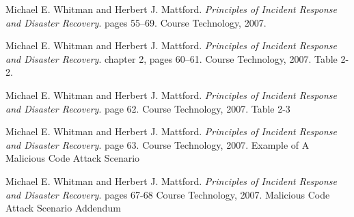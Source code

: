\documentclass[english]{gucreport}
\begin{document}
	\makefrontpages
	\tableofcontents
	\showindex		%
	
	
	
	
	
	
	
	\begin{thebibliography}{99}
			Michael E. Whitman and Herbert J. Mattford.
			\emph{Principles of Incident Response and Disaster Recovery}.
			pages 55–69.
			Course Technology, 2007.
			
			Michael E. Whitman and Herbert J. Mattford.
			\emph{Principles of Incident Response and Disaster Recovery}.
			chapter 2, 	pages 60–61.
			Course Technology, 2007.
			Table 2-2.
			
			Michael E. Whitman and Herbert J. Mattford.
			\emph{Principles of Incident Response and Disaster Recovery}.
			page 62.
			Course Technology, 2007.
			Table 2-3
			
			Michael E. Whitman and Herbert J. Mattford.
			\emph{Principles of Incident Response and Disaster Recovery}.
			page 63.
			Course Technology, 2007.
			Example of A Malicious Code Attack Scenario
			
			Michael E. Whitman and Herbert J. Mattford.
			\emph{Principles of Incident Response and Disaster Recovery}.
			pages 67-68
			Course Technology, 2007.
			Malicious Code Attack Scenario Addendum
	\end{thebibliography}

	\appendix %
\end{document}
